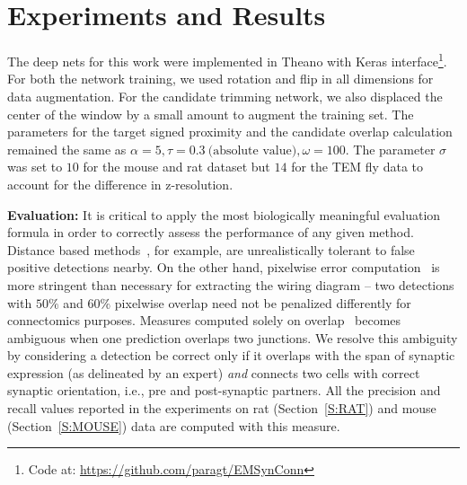 \documentclass{llncs}
\begin{document}


\section{Experiments and Results}\label{S:EXPT}
The deep nets for this work were implemented in Theano with Keras interface\footnote{\scriptsize Code at: \url{https://github.com/paragt/EMSynConn}}. For both the network training, we used rotation and flip in all dimensions for data augmentation. For the candidate trimming network, we also displaced the center of the window by a small amount to augment the training set. The parameters for the target signed proximity and the candidate overlap calculation remained the same as $\alpha = 5, \tau = 0.3~\text{(absolute value)}, \omega = 100$. The parameter  $\sigma$ was set to $10$ for the mouse and rat dataset but $14$ for the TEM fly data to account for the difference in z-resolution. 

\noindent \textbf{Evaluation:} It is critical to apply the most biologically meaningful evaluation formula in order to correctly assess the performance of any given method. Distance based methods~\cite{staffler17synem}\cite{becker13syn}, for example, are unrealistically tolerant to false positive detections nearby. On the other hand, pixelwise error computation~\cite{cremi} is more stringent than necessary for extracting the wiring diagram -- two detections with $50\%$ and $60\%$ pixelwise overlap need not be penalized differently for connectomics purposes. Measures computed solely on overlap~\cite{roncal14vesicle} becomes ambiguous when one prediction overlaps two junctions. We resolve this ambiguity by considering a detection be correct only if it overlaps with the span of synaptic expression (as delineated by an expert) \emph{and} connects two cells with correct synaptic orientation, i.e., pre and post-synaptic partners. All the precision and recall values reported in the experiments on rat (Section~\ref{S:RAT}) and mouse (Section~\ref{S:MOUSE}) data are computed with this measure.
\end{document}
